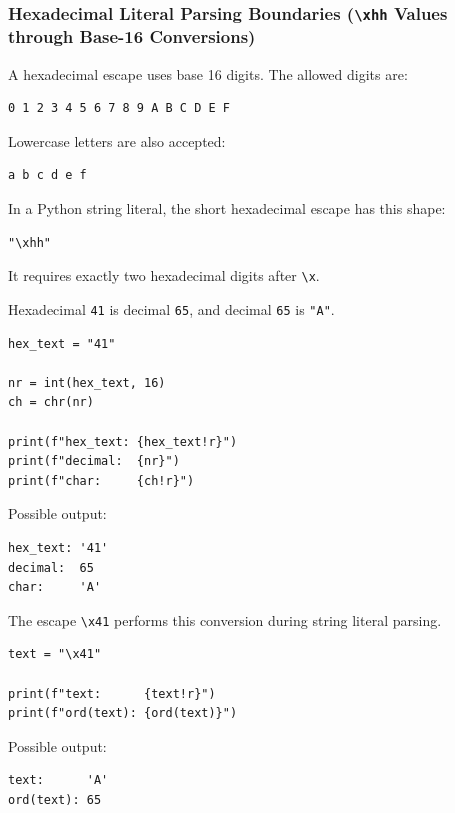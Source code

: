 \subsubsection{Hexadecimal Literal Parsing Boundaries (\texttt{\textbackslash xhh} Values through Base-16 Conversions)}

A hexadecimal escape uses base 16 digits. The allowed digits are:

\begin{verbatim}
0 1 2 3 4 5 6 7 8 9 A B C D E F
\end{verbatim}

Lowercase letters are also accepted:

\begin{verbatim}
a b c d e f
\end{verbatim}

In a Python string literal, the short hexadecimal escape has this shape:

\begin{verbatim}
"\xhh"
\end{verbatim}

It requires exactly two hexadecimal digits after \texttt{\textbackslash x}.

Hexadecimal \texttt{41} is decimal \texttt{65}, and decimal \texttt{65} is \texttt{"A"}.

\begin{verbatim}
hex_text = "41"

nr = int(hex_text, 16)
ch = chr(nr)

print(f"hex_text: {hex_text!r}")
print(f"decimal:  {nr}")
print(f"char:     {ch!r}")
\end{verbatim}

Possible output:

\begin{verbatim}
hex_text: '41'
decimal:  65
char:     'A'
\end{verbatim}

The escape \texttt{\textbackslash x41} performs this conversion during string literal parsing.

\begin{verbatim}
text = "\x41"

print(f"text:      {text!r}")
print(f"ord(text): {ord(text)}")
\end{verbatim}

Possible output:

\begin{verbatim}
text:      'A'
ord(text): 65
\end{verbatim}

